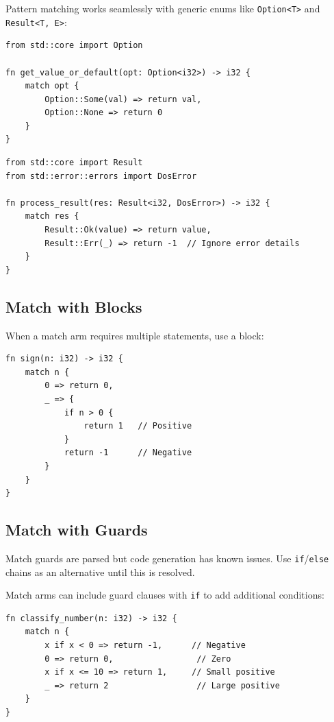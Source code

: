 Pattern matching works seamlessly with generic enums like \texttt{Option<T>} and \texttt{Result<T, E>}:

\begin{lstlisting}
from std::core import Option

fn get_value_or_default(opt: Option<i32>) -> i32 {
    match opt {
        Option::Some(val) => return val,
        Option::None => return 0
    }
}
\end{lstlisting}

\begin{lstlisting}
from std::core import Result
from std::error::errors import DosError

fn process_result(res: Result<i32, DosError>) -> i32 {
    match res {
        Result::Ok(value) => return value,
        Result::Err(_) => return -1  // Ignore error details
    }
}
\end{lstlisting}

\subsection{Match with Blocks}
\label{subsec:match-blocks}

When a match arm requires multiple statements, use a block:

\begin{lstlisting}
fn sign(n: i32) -> i32 {
    match n {
        0 => return 0,
        _ => {
            if n > 0 {
                return 1   // Positive
            }
            return -1      // Negative
        }
    }
}
\end{lstlisting}

\subsection{Match with Guards}
\label{subsec:match-guards}

\begin{tcolorbox}[colback=red!5!white,colframe=red!75!black,title={\textbf{Work in Progress}}]
Match guards are parsed but code generation has known issues. Use \texttt{if}/\texttt{else} chains as an alternative until this is resolved.
\end{tcolorbox}

Match arms can include guard clauses with \texttt{if} to add additional conditions:

\begin{lstlisting}
fn classify_number(n: i32) -> i32 {
    match n {
        x if x < 0 => return -1,      // Negative
        0 => return 0,                 // Zero
        x if x <= 10 => return 1,     // Small positive
        _ => return 2                  // Large positive
    }
}
\end{lstlisting}

